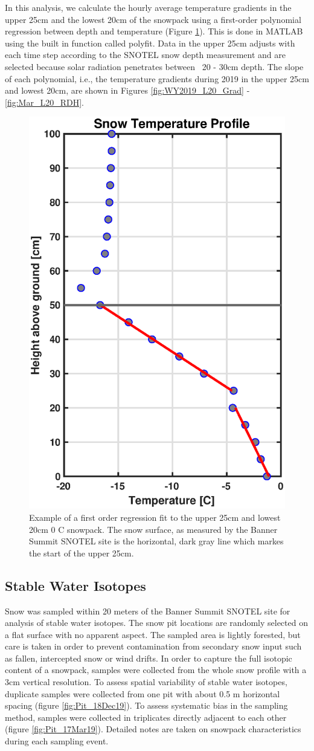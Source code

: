In this analysis, we calculate the hourly average temperature gradients in the upper 25cm and the lowest 20cm of the snowpack using a first-order polynomial regression between depth and temperature (Figure \ref{fig:TempGrad_Ex}). This is done in MATLAB using the built in function called polyfit.  Data in the upper 25cm adjusts with each time step according to the SNOTEL snow depth measurement and are selected because solar radiation penetrates between ~20 - 30cm depth. The slope of each polynomial, i.e., the temperature gradients during 2019 in the upper 25cm and lowest 20cm, are shown in Figures \ref{fig:WY2019_L20_Grad} - \ref{fig:Mar_L20_RDH}.  

\begin{figure}[H]
    \centering
    \includegraphics[width=0.5\linewidth]{figures/TempGrad/TempGrad_Ex.eps}
    \caption{Example of a first order regression fit to the upper 25cm and lowest 20cm 0 \textdegree C snowpack. The snow surface, as measured by the Banner Summit SNOTEL site is the horizontal, dark gray line which markes the start of the upper 25cm.}
    \label{fig:TempGrad_Ex}
\end{figure}

\subsection{Stable Water Isotopes}
Snow was sampled within 20 meters of the Banner Summit SNOTEL site for analysis of stable water isotopes. The snow pit locations are randomly selected on a flat surface with no apparent aspect. The sampled area is lightly forested, but care is taken in order to prevent contamination from secondary snow input such as fallen, intercepted snow or wind drifts. In order to capture the full isotopic content of a snowpack, samples were collected from the whole snow profile with a 3cm vertical resolution. To assess spatial variability of stable water isotopes, duplicate samples were collected from one pit with about 0.5 m horizontal spacing (figure \ref{fig:Pit_18Dec19}). To assess systematic bias in the sampling method, samples were collected in triplicates directly adjacent to each other (figure \ref{fig:Pit_17Mar19}). Detailed notes are taken on snowpack characteristics during each sampling event.

